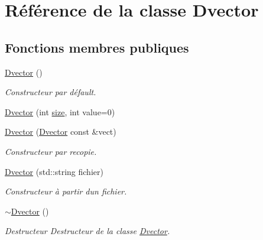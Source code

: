 \hypertarget{class_dvector}{}\section{Référence de la classe Dvector}
\label{class_dvector}
\subsection*{Fonctions membres publiques}
\begin{DoxyCompactItemize}
\item 
\mbox{\label{class_dvector_adf0f620df0feef3311f7d198e649a298}} 
\hyperlink{class_dvector_adf0f620df0feef3311f7d198e649a298}{Dvector} ()
\begin{DoxyCompactList}\small\item\em Constructeur par défault. \end{DoxyCompactList}\item 
\hyperlink{class_dvector_a8a4feb509178ccc26a7d3805548fab17}{Dvector} (int \hyperlink{class_dvector_adda9654f389de24c744e897e93f850fb}{size}, int value=0)
\item 
\hyperlink{class_dvector_aa3a4f95e9bfe8139537593f86640d3af}{Dvector} (\hyperlink{class_dvector}{Dvector} const \&vect)
\begin{DoxyCompactList}\small\item\em Constructeur par recopie. \end{DoxyCompactList}\item 
\mbox{\label{class_dvector_a2f2c20eb463fe2fd695493b5d6871244}} 
\hyperlink{class_dvector_a2f2c20eb463fe2fd695493b5d6871244}{Dvector} (std\+::string fichier)
\begin{DoxyCompactList}\small\item\em Constructeur à partir d\textquotesingle{}un fichier. \end{DoxyCompactList}\item 
\mbox{\label{class_dvector_a3156d0776c5da1a15685970200ec6b96}} 
\hyperlink{class_dvector_a3156d0776c5da1a15685970200ec6b96}{$\sim$\+Dvector} ()
\begin{DoxyCompactList}\small\item\em Destructeur Destructeur de la classe \hyperlink{class_dvector}{Dvector}. \end{DoxyCompactList}\item 

\end{DoxyCompactItemize}
